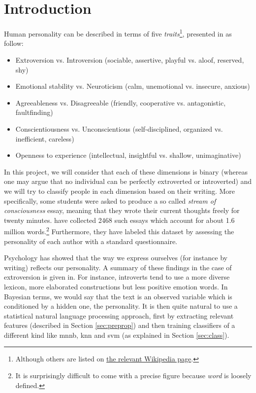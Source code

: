 \section{Introduction}
Human personality can be described in terms of five \emph{traits}\footnote{Although others are listed on
\href{http://en.wikipedia.org/wiki/Trait\_theory\#List\_of\_personality\_traits}{the
relevant Wikipedia page}.}, presented in \autocite{mairesse2007perso} as follow:
\begin{itemize}
\item Extroversion vs. Introversion (sociable, assertive, playful vs. aloof, reserved, shy)
\item Emotional stability vs. Neuroticism (calm, unemotional vs. insecure, anxious)
\item Agreeableness vs. Disagreeable (friendly, cooperative vs. antagonistic, faultfinding)
\item Conscientiousness vs. Unconscientious (self-disciplined, organized vs. inefficient, careless)
\item Openness to experience (intellectual, insightful vs. shallow, unimaginative)
\end{itemize}

In this project, we will consider that each of these dimensions is binary (whereas one may argue that no individual can be perfectly extroverted or introverted) and we will try to classify people in each dimension based on their writing. More specifically, some students were asked to produce a so called \emph{stream of consciousness} essay, meaning that they wrote their current thoughts freely for twenty minutes. \Textcite{pennebaker1999corpus} have collected 2468 such essays which account for about 1.6 million words.\footnote{It is surprisingly difficult to come with a precise figure because \emph{word} is loosely defined.} Furthermore, they have labeled this dataset by assessing the personality of each author with a standard questionnaire.

Psychology has showed that the way we express ourselves (for instance by writing) reflects our personality. A summary of these findings in the case of extroversion is given in\autocite[][Table 1]{mairesse2007perso}. For instance, introverts tend to use a more diverse lexicon, more elaborated constructions but less positive emotion words. In Bayesian terms, we would say that the text is an observed variable which is conditioned by a hidden one, the personality. It is then quite natural to use a statistical natural language processing approach, first by extracting relevant features (described in Section \vref{sec:preprop}) and then training classifiers of a different kind like \gls{mnnb}, \gls{knn} and \gls{svm} (as explained in Section \vref{sec:class}).


